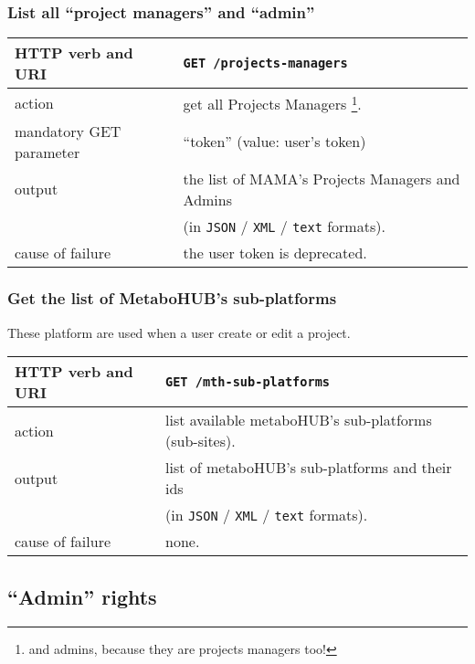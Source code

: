 \subsubsection{List all ``project managers'' and ``admin''}
\begin{tabular}{ | l | l | }
	\hline
	HTTP verb and URI & \texttt{GET /projects-managers} \\
	\hline
	action & get all Projects Managers \footnote{and admins, because they are projects managers too!}. \\
	\hline
	mandatory GET parameter & ``token'' (value: user's token) \\
	\hline
	output & the list of MAMA's Projects Managers and Admins \\ 
	\space & (in \texttt{JSON} / \texttt{XML} / \texttt{text} formats). \\
	\hline
	cause of failure & the user token is deprecated. \\
	\hline
\end{tabular}
\newline

\subsubsection{Get the list of MetaboHUB's sub-platforms}
\hspace*{\parindent}
These platform are used when a user create or edit a project.
\newline
\begin{tabular}{ | l | l | }
	\hline
	HTTP verb and URI & \texttt{GET /mth-sub-platforms} \\
	\hline
	action & list available metaboHUB's sub-platforms (sub-sites). \\
	\hline
	output & list of metaboHUB's sub-platforms and their ids \\
	\space & (in \texttt{JSON} / \texttt{XML} / \texttt{text} formats). \\
	\hline
	cause of failure & none. \\
	\hline
\end{tabular}
\newline

\subsection{``Admin'' rights}

